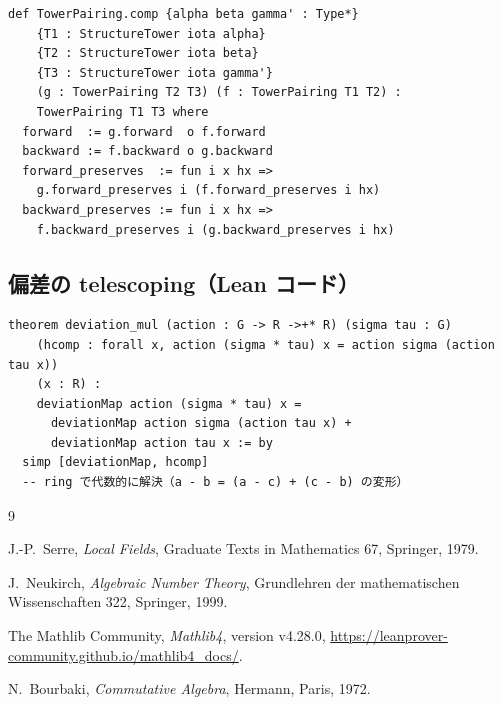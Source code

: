 \documentclass[a4paper,11pt]{ltjsarticle}
\theoremstyle{definition}
\theoremstyle{plain}
\theoremstyle{remark}
\begin{document}
\begin{lstlisting}[caption={TowerPairing の合成（NT3-2d）}]
def TowerPairing.comp {alpha beta gamma' : Type*}
    {T1 : StructureTower iota alpha}
    {T2 : StructureTower iota beta}
    {T3 : StructureTower iota gamma'}
    (g : TowerPairing T2 T3) (f : TowerPairing T1 T2) :
    TowerPairing T1 T3 where
  forward  := g.forward  o f.forward
  backward := f.backward o g.backward
  forward_preserves  := fun i x hx =>
    g.forward_preserves i (f.forward_preserves i hx)
  backward_preserves := fun i x hx =>
    f.backward_preserves i (g.backward_preserves i hx)
\end{lstlisting}

\subsection{偏差の telescoping（Lean コード）}

\begin{lstlisting}[caption={deviation\_mul（NT3-5c）：telescoping 恒等式}]
theorem deviation_mul (action : G -> R ->+* R) (sigma tau : G)
    (hcomp : forall x, action (sigma * tau) x = action sigma (action tau x))
    (x : R) :
    deviationMap action (sigma * tau) x =
      deviationMap action sigma (action tau x) +
      deviationMap action tau x := by
  simp [deviationMap, hcomp]
  -- ring で代数的に解決（a - b = (a - c) + (c - b) の変形）
\end{lstlisting}

\begin{thebibliography}{9}

J.-P.~Serre,
\textit{Local Fields},
Graduate Texts in Mathematics 67, Springer, 1979.

J.~Neukirch,
\textit{Algebraic Number Theory},
Grundlehren der mathematischen Wissenschaften 322, Springer, 1999.

The Mathlib Community,
\textit{Mathlib4}, version v4.28.0,
\url{https://leanprover-community.github.io/mathlib4_docs/}.

N.~Bourbaki,
\textit{Commutative Algebra},
Hermann, Paris, 1972.

\end{thebibliography}
\end{document}
